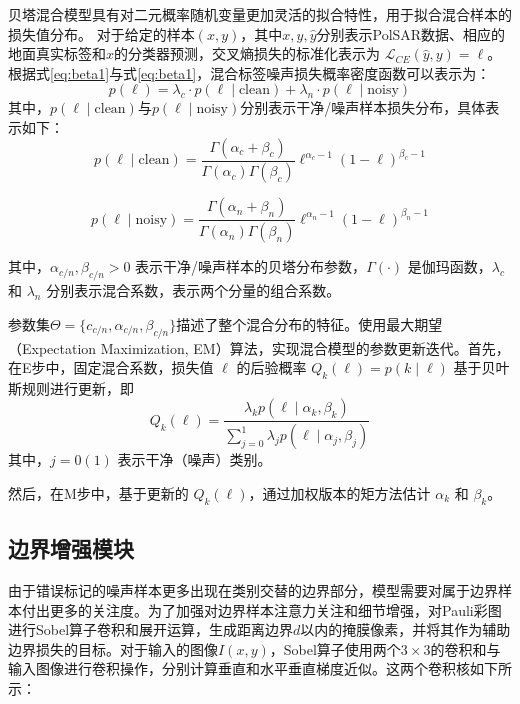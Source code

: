 贝塔混合模型具有对二元概率随机变量更加灵活的拟合特性，用于拟合混合样本的损失值分布。
对于给定的样本$(x, y)$，其中$x, y, \hat{y}$分别表示PolSAR数据、相应的地面真实标签和$x$的分类器预测，交叉熵损失的标准化表示为 $\mathcal{L}_{CE}(\hat{y}, y) = \ell$。根据式\ref{eq:beta1}与式\ref{eq:beta1}，混合标签噪声损失概率密度函数可以表示为：
\begin{equation}
    p(\ell)=\lambda_c \cdot p(\ell \mid \text{clean})+\lambda_n \cdot p(\ell \mid \text{noisy})
\end{equation}
其中，$p(\ell \mid \text{clean})$与$p(\ell \mid \text{noisy})$分别表示干净/噪声样本损失分布，具体表示如下：
\begin{equation}
    p(\ell \mid \text{clean})=\frac{\Gamma(\alpha_c+\beta_c)}{\Gamma(\alpha_c) \Gamma(\beta_c)} \ell^{\alpha_c-1}(1-\ell)^{\beta_c-1}
\end{equation}

\begin{equation}
    p(\ell \mid \text{noisy})=\frac{\Gamma(\alpha_n+\beta_n)}{\Gamma(\alpha_n) \Gamma(\beta_n)} \ell^{\alpha_n-1}(1-\ell)^{\beta_n-1}
    \label{eq:BMM_PDF}
\end{equation}

其中，$\alpha_{c/n}, \beta_{c/n} > 0$ 表示干净/噪声样本的贝塔分布参数，$\Gamma(\cdot)$ 是伽玛函数，$\lambda_{c}$ 和 $\lambda_{n}$ 分别表示混合系数，表示两个分量的组合系数。

参数集$\Theta = \{c_{c/n}, \alpha_{c/n}, \beta_{c/n}\}$描述了整个混合分布的特征。使用最大期望（Expectation Maximization, EM）算法，实现混合模型的参数更新迭代。首先，在E步中，固定混合系数，损失值 \(\ell\) 的后验概率 \(Q_k(\ell)=p(k \mid \ell)\) 基于贝叶斯规则进行更新，即
\begin{equation}
    Q_k(\ell)=\frac{\lambda_k p(\ell \mid \alpha_k, \beta_k)}{\sum_{j=0}^{1}\lambda_j p(\ell \mid \alpha_j, \beta_j)}
\end{equation}
其中，$j=0(1)$ 表示干净（噪声）类别。

然后，在M步中，基于更新的 \(Q_k(\ell)\)，通过加权版本的矩方法估计 \(\alpha_k\) 和 \(\beta_k\)。

\subsection{边界增强模块}

由于错误标记的噪声样本更多出现在类别交替的边界部分，模型需要对属于边界样本付出更多的关注度。为了加强对边界样本注意力关注和细节增强，对Pauli彩图进行Sobel算子卷积和展开运算，生成距离边界$d$以内的掩膜像素，并将其作为辅助边界损失的目标。对于输入的图像$I(x,y)$，Sobel算子使用两个$3 \times 3$的卷积和与输入图像进行卷积操作，分别计算垂直和水平垂直梯度近似。这两个卷积核如下所示：

